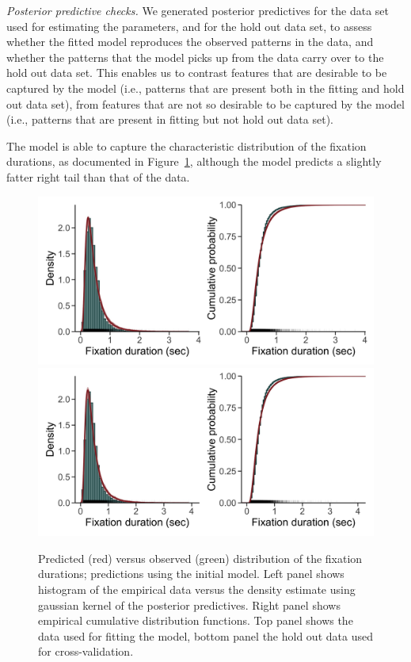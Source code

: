 \documentclass{article}
\begin{document}
\textit{Posterior predictive checks.} We generated posterior predictives for the data set used for estimating the parameters, and for the hold out data set, to assess whether the fitted model reproduces the observed patterns in the data, and whether the patterns that the model picks up from the data carry over to the hold out data set. This enables us to contrast features that are desirable to be captured by the model (i.e., patterns that are present both in the fitting and hold out data set), from features that are not so desirable to be captured by the model (i.e., patterns that are present in fitting but not hold out data set).

The model is able to capture the characteristic distribution of the fixation durations, as documented in Figure~\ref{fig:predictives_in_sample_durations}, although the model predicts a slightly fatter right tail than that of the data.

\begin{figure}
    \centering
    \includegraphics[width=\textwidth]{figures/fit_model/in_sample/fixation_durations.jpg}
    \includegraphics[width=\textwidth]{figures/fit_model/out_sample/fixation_durations.jpg}
    \caption{Predicted (red) versus observed (green) distribution of the fixation durations; predictions using the initial model. Left panel shows histogram of the empirical data versus the density estimate using gaussian kernel of the posterior predictives. Right panel shows empirical cumulative distribution functions. Top panel shows the data used for fitting the model, bottom panel the hold out data used for cross-validation.}
    \label{fig:predictives_in_sample_durations}
\end{figure}
\end{document}
